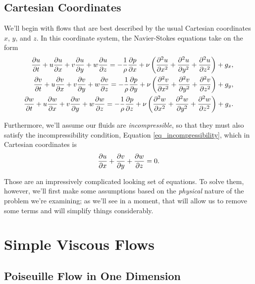 
\subsection{Cartesian Coordinates}

We'll begin with flows that are best described by the usual Cartesian coordinates $x$, $y$, and $z$.  In this coordinate system, the Navier-Stokes equations take on the form
\begin{align}
\label{eq_ns_cart1}
\frac{\partial {u}}{\partial {t}} + u\frac{\partial {u}}{\partial {x}} + v \frac{\partial {u}}{\partial {y}} + w \frac{\partial {u}}{\partial {z}} = -\frac{1}{\rho} \frac{\partial {p}}{\partial {x}} + \nu \left( \frac{\partial^2 {u}}{\partial {x}^2} + \frac{\partial^2 {u}}{\partial {y}^2} + \frac{\partial^2 {u}}{\partial {z}^2} \right) + g_x, \\
\frac{\partial {v}}{\partial {t}} + u\frac{\partial {v}}{\partial {x}} + v \frac{\partial {v}}{\partial {y}} + w \frac{\partial {v}}{\partial {z}} = -\frac{1}{\rho} \frac{\partial {p}}{\partial {y}} + \nu \left( \frac{\partial^2 {v}}{\partial {x}^2} + \frac{\partial^2 {v}}{\partial {y}^2} + \frac{\partial^2 {v}}{\partial {z}^2} \right) + g_y, \\
\frac{\partial {w}}{\partial {t}} + u\frac{\partial {w}}{\partial {x}} + v \frac{\partial {w}}{\partial {y}} + w \frac{\partial {w}}{\partial {z}} = -\frac{1}{\rho} \frac{\partial {p}}{\partial {z}} + \nu \left( \frac{\partial^2 {w}}{\partial {x}^2} + \frac{\partial^2 {w}}{\partial {y}^2} + \frac{\partial^2 {w}}{\partial {z}^2} \right) + g_z.
\end{align}

Furthermore, we'll assume our fluids are \emph{incompressible}, so that they must also satisfy the incompressibility condition, Equation \ref{eq_incompressibility}, which in Cartesian coordinates is
\begin{equation}
\label{eq_incomp_cart}
\frac{\partial {u}}{\partial {x}}  + \frac{\partial {v}}{\partial {y}} + \frac{\partial {w}}{\partial {z}} = 0.
\end{equation}

Those are an impressively complicated looking set of equations.  To solve them, however, we'll first make some assumptions based on the \emph{physical} nature of the problem we're examining; as we'll see in a moment, that will allow us to remove some terms and will simplify things considerably.

%
% 

\section{Simple Viscous Flows}



\subsection{Poiseuille Flow in One Dimension}
\label{sec_poise_1d}

